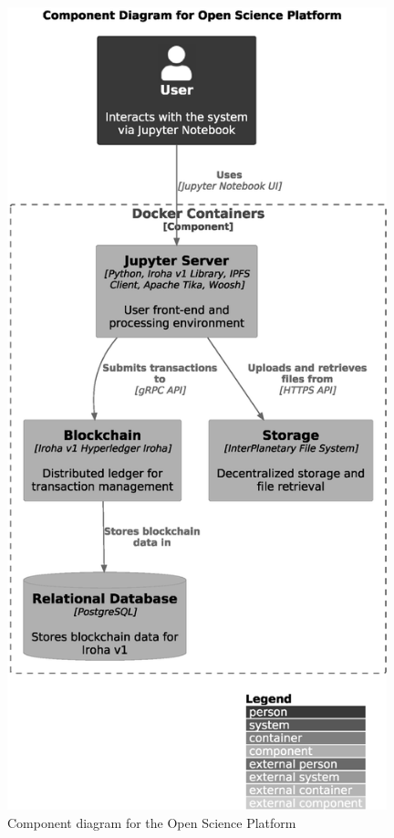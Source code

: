 \documentclass[final]{rc-book-2.14}
\begin{document}
\begin{figure}[htbp]
    \centering
    \includegraphics[width=0.98\textwidth, keepaspectratio]{fig/c4_component_diagram.eps}
    \caption{Component diagram for the Open Science Platform}
    \label{fig:c4_component_diagram}
\end{figure}
\end{document}
